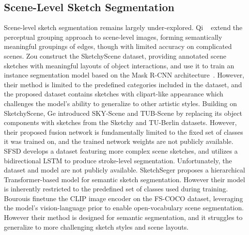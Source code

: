 \subsection{Scene-Level Sketch Segmentation}
Scene-level sketch segmentation remains largely under-explored. Qi \etal~ extend the perceptual grouping approach to scene-level images, forming semantically meaningful groupings of edges, though with limited accuracy on complicated scenes.
Zou \etal{} construct the SketchyScene dataset, providing annotated scene sketches with meaningful layouts of object interactions, and use it to train an instance segmentation model based on the Mask R-CNN architecture~\cite{he2018maskrcnn}. However, their method is limited to the predefined categories included in the dataset, and the proposed dataset contains sketches with clipart-like appearance which challenges the model's ability to generalize to other artistic styles. 
Building on SketchyScene, Ge \etal {} introduced SKY-Scene and TUB-Scene by replacing its object components with sketches from the Sketchy  and TU-Berlin  datasets. However, their proposed fusion network is fundamentally limited to the fixed set of classes it was trained on, and the trained network weights are not publicly available.
SFSD \cite{zhang2023strokeSeg} develops a dataset featuring more complex scene sketches, and utilizes a bidirectional LSTM to produce stroke-level segmentation. Unfortunately, the dataset and model are not publicly available.
SketchSeger \cite{yang2023sceneHierTransformer} proposes a hierarchical Transformer-based model for semantic sketch segmentation. However their model is inherently restricted to the predefined set of classes used during training. Bourouis \etal {} finetune the CLIP image encoder \cite{radford2021clip} on the FS-COCO \cite{fscoco} dataset, leveraging the model's vision-language prior to enable open-vocabulary scene segmentation. However their method is designed for semantic segmentation, and it struggles to generalize to more challenging sketch styles and scene layouts.
